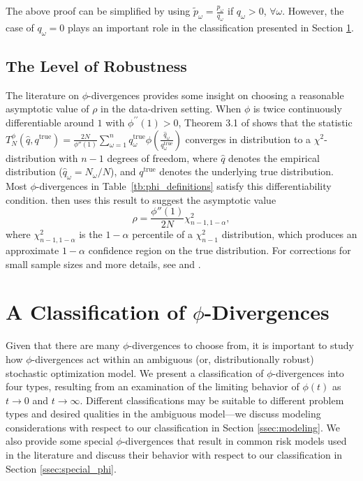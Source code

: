 \documentclass[ijoc,letterpaper]{informs3} %
\newcommand{\qtrue}{q^{\text{true}}}
\begin{document}
\begin{remark}
	The above proof can be simplified by using $\tilde{p}_\omega = \frac{p_\omega}{q_\omega}$ if $q_\omega > 0$, $\forall \omega$.
	However, the case of $q_\omega = 0$ plays an important role in the classification presented in Section \ref{sec:classification}.
\end{remark}



\subsection{The Level of Robustness}
\label{ssec:robust_level}

The literature on $\phi$-divergences provides some insight on choosing a reasonable asymptotic value of $\rho$ in the data-driven setting. 
When $\phi$ is twice continuously differentiable around $1$ with $\phi^{\prime \prime}(1)>0$, Theorem 3.1 of \cite{pardo2005statistical} shows that the statistic $T^\phi_N(\hat{q},\qtrue) = \frac{2N}{\phi''(1)} \sum_{\omega=1}^n \qtrue_\omega \phi\left(\frac{\hat{q}_\omega}{\qtrue_\omega}\right)$ converges in distribution to a $\chi^2$-distribution with $n-1$ degrees of freedom, where $\hat{q}$ denotes the empirical distribution ($\hat{q}_\omega = N_\omega/N$), and $\qtrue$ denotes the underlying true distribution.
Most $\phi$-divergences in Table~\ref{tb:phi_definitions} satisfy this differentiability condition.
\cite{bental2011robust} then uses this result to suggest the asymptotic value
\begin{equation} \label{eq:asymptotic_rho}
	\rho = \frac{\phi''(1)}{2N} \chi^2_{n-1,1-\alpha},
\end{equation}
where $\chi^2_{n-1,1-\alpha}$ is the $1-\alpha$ percentile of a $\chi^2_{n-1}$ distribution, which produces an approximate $1-\alpha$ confidence region on the true distribution.
For corrections for small sample sizes and more details, see \citep{pardo2005statistical} and \citep{bental2011robust}.

\section{A Classification of $\phi$-Divergences}
\label{sec:classification}

Given that there are many $\phi$-divergences to choose from, it is important to study how $\phi$-divergences act within an ambiguous (or, distributionally robust) stochastic optimization model. 
We present a classification of $\phi$-divergences into four types, resulting from an examination of the limiting behavior of $\phi(t)$ as $t \rightarrow 0$ and $t \rightarrow \infty$.
Different classifications may be suitable to different problem types and desired qualities in the ambiguous model---we discuss modeling considerations with respect to our classification in Section \ref{ssec:modeling}.
We also provide some special $\phi$-divergences that result in common risk models used in the literature and discuss their behavior with respect to our classification in Section \ref{ssec:special_phi}.
\end{document}
